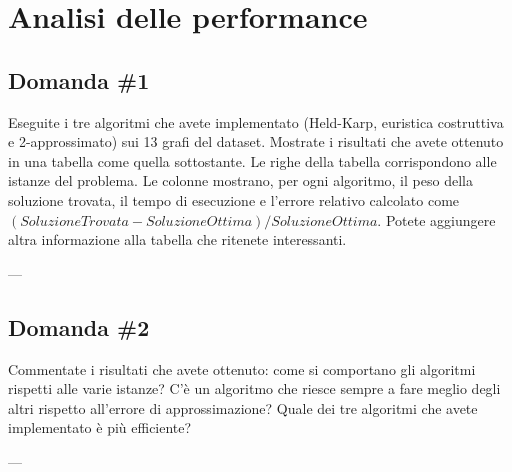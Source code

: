 \section{Analisi delle performance}
\label{cap:performance-analysis}

\subsection{Domanda \#1}

\begin{displayquote}
Eseguite i tre algoritmi che avete implementato (Held-Karp, euristica costruttiva e 2-approssimato) sui 13 grafi del dataset. Mostrate i risultati che avete ottenuto in una tabella come quella sottostante. Le righe della tabella corrispondono alle istanze del problema. Le colonne mostrano, per ogni algoritmo, il peso della soluzione trovata, il tempo di esecuzione e l'errore relativo calcolato come $(SoluzioneTrovata−SoluzioneOttima)/SoluzioneOttima$. Potete aggiungere altra informazione alla tabella che ritenete interessanti. 
\end{displayquote}

\noindent --- \\


\subsection{Domanda \#2}

\begin{displayquote}
Commentate i risultati che avete ottenuto: come si comportano gli algoritmi rispetti alle varie istanze? C'è un algoritmo che riesce sempre a fare meglio degli altri rispetto all'errore di approssimazione? Quale dei tre algoritmi che avete implementato è più efficiente? 
\end{displayquote}


\noindent ---\\
